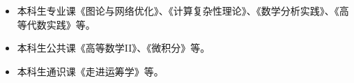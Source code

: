 %
%


\begin{itemize}
	\item 本科生专业课《图论与网络优化》、《计算复杂性理论》、《数学分析实践》、《高等代数实践》等。
	\item 本科生公共课《高等数学II》、《微积分》等。
	\item 本科生通识课《走进运筹学》等。
\end{itemize}